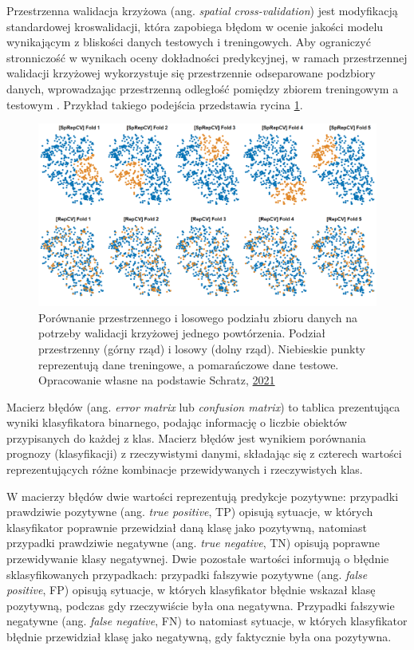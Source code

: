 \documentclass{amuthesis}
\begin{document}
Przestrzenna walidacja krzyżowa (ang. \emph{spatial cross-validation})
jest modyfikacją standardowej kroswalidacji, która zapobiega błędom w
ocenie jakości modelu wynikającym z bliskości danych testowych i
treningowych. Aby ograniczyć stronniczość w wynikach oceny dokładności
predykcyjnej, w ramach przestrzennej walidacji krzyżowej wykorzystuje
się przestrzennie odseparowane podzbiory danych, wprowadzając
przestrzenną odległość pomiędzy zbiorem treningowym a testowym
\autocite{pohjankukka_2017_scv}. Przykład takiego podejścia przedstawia
rycina \ref{fig-rycina-spcv}.

\begin{figure}[t]

{\centering \includegraphics[width=1\textwidth,height=\textheight]{figures/spcv_plot.png}

}

\caption{\label{fig-rycina-spcv}Porównanie przestrzennego i losowego
podziału zbioru danych na potrzeby walidacji krzyżowej jednego
powtórzenia. Podział przestrzenny (górny rząd) i losowy (dolny rząd).
Niebieskie punkty reprezentują dane treningowe, a pomarańczowe dane
testowe. Opracowanie własne na podstawie Schratz,
\href{https://mlr.mlr-org.com/articles/tutorial/handling_of_spatial_data.html}{2021}}

\end{figure}

Macierz błędów (ang. \emph{error matrix} lub \emph{confusion matrix}) to
tablica prezentująca wyniki klasyfikatora binarnego, podając informację
o liczbie obiektów przypisanych do każdej z klas. Macierz błędów jest
wynikiem porównania prognozy (klasyfikacji) z rzeczywistymi danymi,
składając się z czterech wartości reprezentujących różne kombinacje
przewidywanych i rzeczywistych klas.

W macierzy błędów dwie wartości reprezentują predykcje pozytywne:
przypadki prawdziwie pozytywne (ang. \emph{true positive}, TP) opisują
sytuacje, w których klasyfikator poprawnie przewidział daną klasę jako
pozytywną, natomiast przypadki prawdziwie negatywne (ang. \emph{true
negative}, TN) opisują poprawne przewidywanie klasy negatywnej. Dwie
pozostałe wartości informują o błędnie sklasyfikowanych przypadkach:
przypadki fałszywie pozytywne (ang. \emph{false positive}, FP) opisują
sytuacje, w których klasyfikator błędnie wskazał klasę pozytywną,
podczas gdy rzeczywiście była ona negatywna. Przypadki fałszywie
negatywne (ang. \emph{false negative}, FN) to natomiast sytuacje, w
których klasyfikator błędnie przewidział klasę jako negatywną, gdy
faktycznie była ona pozytywna.
\end{document}
